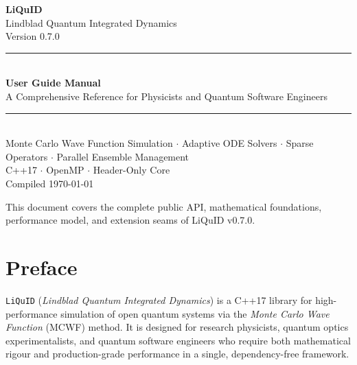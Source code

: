 \documentclass[11pt,a4paper,twoside]{book}
\newcommand{\liquid}{\texttt{LiQuID}}
\theoremstyle{definition}
\theoremstyle{remark}
\begin{document}
\begin{titlepage}
\pagecolor{LiquidBlue}
\color{white}
\vspace*{20mm}
\begin{center}
  {\fontsize{52}{60}\selectfont\bfseries LiQuID}\\[6pt]
  {\Large\color{LiquidGold} Lindblad Quantum Integrated Dynamics}\\[4mm]
  {\large Version 0.7.0}\\[20mm]
  {\color{LiquidMid}\rule{0.7\linewidth}{1pt}}\\[8mm]
  {\LARGE\bfseries User Guide Manual}\\[6mm]
  {\large A Comprehensive Reference for Physicists and Quantum Software Engineers}\\[12mm]
  {\color{LiquidMid}\rule{0.7\linewidth}{1pt}}\\[16mm]
  {\normalsize
    Monte Carlo Wave Function Simulation $\cdot$
    Adaptive ODE Solvers $\cdot$
    Sparse Operators $\cdot$
    Parallel Ensemble Management
  }\\[8mm]
  {\normalsize C++17 $\cdot$ OpenMP $\cdot$ Header-Only Core}\\[20mm]
  {\small\color{LiquidMid} Compiled \today}
\end{center}
\vfill
\begin{center}
  {\small\color{LiquidMid}
    This document covers the complete public API, mathematical foundations,
    performance model, and extension seams of LiQuID v0.7.0.
  }
\end{center}
\end{titlepage}
\nopagecolor
\color{black}

\frontmatter
\pagestyle{fancy}

\chapter*{Preface}

\liquid{} (\emph{Lindblad Quantum Integrated Dynamics}) is a C++17 library for
high-performance simulation of open quantum systems via the
\emph{Monte Carlo Wave Function} (MCWF) method. It is designed for research
physicists, quantum optics experimentalists, and quantum software engineers who
require both mathematical rigour and production-grade performance in a single,
dependency-free framework.
\end{document}
